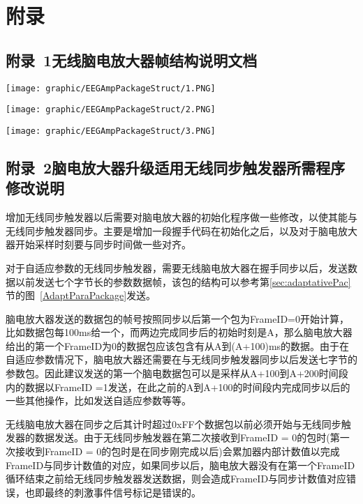 \chapter*{附\qquad 录}
\section*{附录~1\quad	无线脑电放大器帧结构说明文档}
\vspace{3mm}
\begin{center}
\texttt{[image: graphic/EEGAmpPackageStruct/1.PNG]}
\end{center}

\begin{center}
\texttt{[image: graphic/EEGAmpPackageStruct/2.PNG]}
\end{center}

\begin{center}
\texttt{[image: graphic/EEGAmpPackageStruct/3.PNG]}
\end{center}

\section*{附录~2\quad 脑电放大器升级适用无线同步触发器所需程序修改说明}
\songti{}

	增加无线同步触发器以后需要对脑电放大器的初始化程序做一些修改，以使其能与无线同步触发器同步。主要是增加一段握手代码在初始化之后，以及对于脑电放大器开始采样时刻要与同步时间做一些对齐。

	对于自适应参数的无线同步触发器，需要无线脑电放大器在握手同步以后，发送数据以前发送七个字节长的参数数据帧，该包的结构可以参考第\ref{sec:adaptativePac}节的图~\ref{AdaptParaPackage}发送。

	脑电放大器发送的数据包的帧号按照同步以后第一个包为FrameID=0开始计算，比如数据包每100ms给一个，而两边完成同步后的初始时刻是A，那么脑电放大器给出的第一个FrameID为0的数据包应该包含有从A到(A+100)ms的数据。由于在自适应参数情况下，脑电放大器还需要在与无线同步触发器同步以后发送七字节的参数包。因此建议发送的第一个脑电数据包可以是采样从A+100到A+200时间段内的数据以FrameID =1发送，在此之前的A到A+100的时间段内完成同步以后的一些其他操作，比如发送自适应参数等等。

	无线脑电放大器在同步之后其计时超过0xFF个数据包以前必须开始与无线同步触发器的数据发送。由于无线同步触发器在第二次接收到FrameID = 0的包时(第一次接收到FrameID = 0的包时是在同步刚完成以后)会累加器内部计数值以完成FrameID与同步计数值的对应，如果同步以后，脑电放大器没有在第一个FrameID循环结束之前给无线同步触发器发送数据，则会造成FrameID与同步计数值对应错误，也即最终的刺激事件信号标记是错误的。

